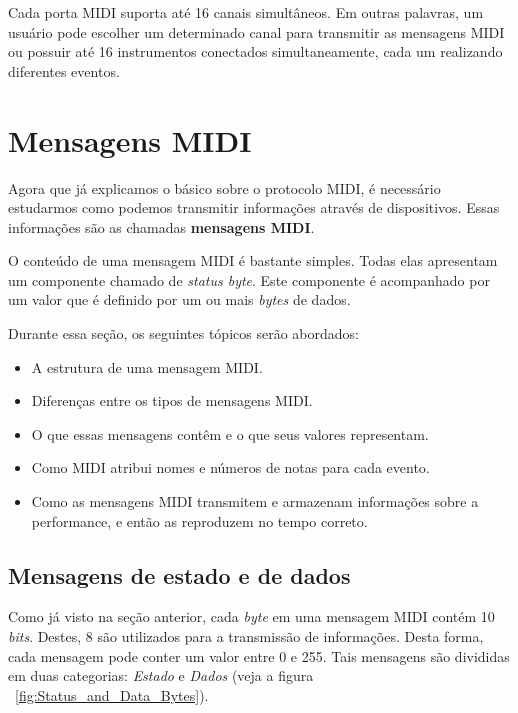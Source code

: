             Cada porta MIDI suporta até 16 canais simultâneos. Em outras palavras, um usuário pode escolher um determinado canal para transmitir as mensagens MIDI ou possuir até 16 instrumentos conectados simultaneamente, cada um realizando diferentes eventos.

    \section{Mensagens MIDI}

        Agora que já explicamos o básico sobre o protocolo MIDI, é necessário estudarmos como podemos transmitir informações através de dispositivos. Essas informações são as chamadas \textbf{mensagens MIDI}.

        O conteúdo de uma mensagem MIDI é bastante simples. Todas elas apresentam um componente chamado de \textit{status byte}. Este componente é acompanhado por um valor que é definido por um ou mais \textit{bytes} de dados.

        Durante essa seção, os seguintes tópicos serão abordados:

        \begin{itemize}
                \item A estrutura de uma mensagem MIDI.

                \item Diferenças entre os tipos de mensagens MIDI.

                \item O que essas mensagens contêm e o que seus valores representam.

                \item Como MIDI atribui nomes e números de notas para cada evento.

                \item Como as mensagens MIDI transmitem e armazenam informações sobre a performance, e então as reproduzem no tempo correto.
        \end{itemize}

        \subsection{Mensagens de estado e de dados}

            Como já visto na seção anterior, cada \textit{byte} em uma mensagem MIDI contém 10 \textit{bits}. Destes, 8 são utilizados para a transmissão de informações. Desta forma, cada mensagem pode conter um valor entre 0 e 255. Tais mensagens são divididas em duas categorias: \textit{Estado} e \textit{Dados} (veja a figura ~\ref{fig:Status_and_Data_Bytes}).

